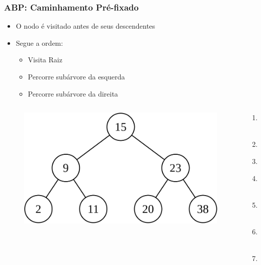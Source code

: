 \documentclass[aspectratio=169]{beamer}
\begin{document}
\begin{frame}\frametitle{ABP: Caminhamento Pré-fixado}
\begin{itemize}
	\item O nodo é visitado antes de seus descendentes
	\item Segue a ordem:
	\begin{itemize}
		\item Visita Raiz
		\item Percorre subárvore da esquerda
		\item Percorre subárvore da direita
	\end{itemize}
\end{itemize}
\begin{columns}[T]
\begin{column}{0.7\linewidth}
\begin{figure}[h]
	\centering
	\includegraphics[height=0.3\paperheight]{imagens/abp02.png}
\end{figure}
\end{column}
\begin{column}{0.3\linewidth}
\pause
\begin{enumerate}
	\small
	\item 15
	\item 9
	\item 2
	\item 11
	\item 23
	\item 20
	\item 38
\end{enumerate}
\end{column}
\end{columns}
\end{frame}
\end{document}
